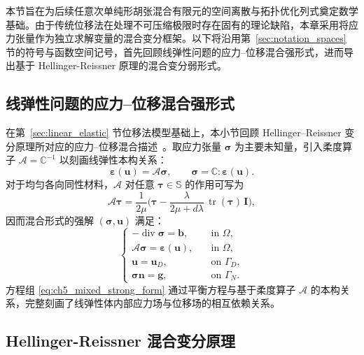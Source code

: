 本节旨在为后续任意次单纯形胡张混合有限元的空间离散与拓扑优化列式奠定数学基础。由于传统位移法在处理不可压缩极限时存在固有的理论缺陷，本章采用将应力张量作为独立求解变量的混合变分框架。以下将沿用第~\ref{sec:notation_spaces} 节的符号与函数空间记号，首先回顾线弹性问题的应力--位移混合强形式，进而导出基于 Hellinger-Reissner 原理的混合变分弱形式。


\subsection{线弹性问题的应力--位移混合强形式}
\label{subsec:hz_strong_form}

在第~\ref{sec:linear_elastic} 节位移法模型基础上，本小节回顾 Hellinger–Reissner 变分原理所对应的应力--位移混合描述~\cite{brezziMixedHybridFinite1991}。取应力张量 $\boldsymbol\sigma$ 为主要未知量，引入柔度算子 $\mathcal A=\mathbb C^{-1}$ 以刻画线弹性本构关系：
\[
\boldsymbol\varepsilon(\boldsymbol u)=\mathcal A\boldsymbol\sigma,\qquad  \boldsymbol\sigma=\mathbb C:\boldsymbol\varepsilon(\boldsymbol u).
\]
对于均匀各向同性材料，$\mathcal{A}$ 对任意 $\boldsymbol{\tau}\in\mathbb{S}$ 的作用可写为
\[
\mathcal{A}\boldsymbol{\tau} =\frac{1}{2\mu}\Big(\boldsymbol{\tau} -\frac{\lambda}{2\mu+d\lambda}\,\operatorname{tr}(\boldsymbol{\tau})\,\boldsymbol{I}\Big),
\]
因而混合形式的强解 $(\boldsymbol{\sigma},\boldsymbol{u})$ 满足：
\begin{equation} 
	\begin{cases}
		-\operatorname{div}\boldsymbol{\sigma} = \boldsymbol{b}, &\quad \text{in } \Omega, \\
		\mathcal{A}\boldsymbol{\sigma} = \boldsymbol{\varepsilon}(\boldsymbol{u}), &\quad \text{in } \Omega, \\
		\boldsymbol{u} = \boldsymbol{u}_{D}, &\quad \text{on } \Gamma_D, \\
		\boldsymbol{\sigma}\boldsymbol{n} = \boldsymbol{g}, &\quad \text{on } \Gamma_N.
	\end{cases}
	\label{eq:ch5_mixed_strong_form}
\end{equation}
方程组 \eqref{eq:ch5_mixed_strong_form} 通过平衡方程与基于柔度算子 $\mathcal{A}$ 的本构关系，完整刻画了线弹性体内部应力场与位移场的相互依赖关系。


\subsection{Hellinger-Reissner 混合变分原理}
\label{subsec:hz_hr_principle}

